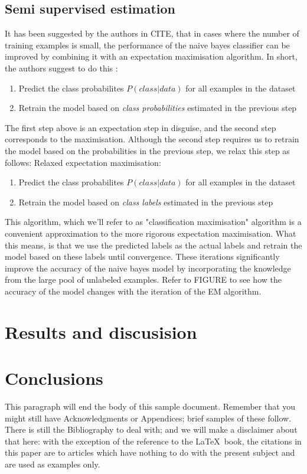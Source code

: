 \documentclass{sig-alternate-05-2015}
\begin{document}
\subsection{Semi supervised estimation}
It has been suggested by the authors in CITE, that in cases where the number of training examples is small, the performance of the naive bayes classifier can be improved by combining it with an expectation maximisation algorithm. In short, the authors suggest to do this :
\begin{enumerate}
\item Predict the class probabilites $P(class|data)$ for all examples in the dataset
\item Retrain the model based on \textit{class probabilities} estimated in the previous step
\end{enumerate}
The first step above is an expectation step  in disguise, and the second step corresponds to the maximisation. Although the second step requires us to retrain the model based on the probabilities in the previous step, we relax this step as follows:
Relaxed expectation maximisation:

\begin{enumerate}
\item Predict the class probabilites $P(class|data)$ for all examples in the dataset
\item Retrain the model based on \textit{class labels} estimated in the previous step
\end{enumerate}
This algorithm, which we'll refer to as  "classification maximisation" algorithm is a convenient approximation to the more rigorous expectation maximisation. What this means, is that we use the predicted labels as the actual labels and retrain the model based on these labels until convergence. These iterations significantly improve the accuracy of the naive bayes model by incorporating the knowledge from the large pool of unlabeled examples. Refer to FIGURE to see how the accuracy of the model changes with the iteration of the EM algorithm. 



\section{Results and discusision}

\section{Conclusions}
This paragraph will end the body of this sample document.
Remember that you might still have Acknowledgments or
Appendices; brief samples of these
follow.  There is still the Bibliography to deal with; and
we will make a disclaimer about that here: with the exception
of the reference to the \LaTeX\ book, the citations in
this paper are to articles which have nothing to
do with the present subject and are used as
examples only.
\end{document}
